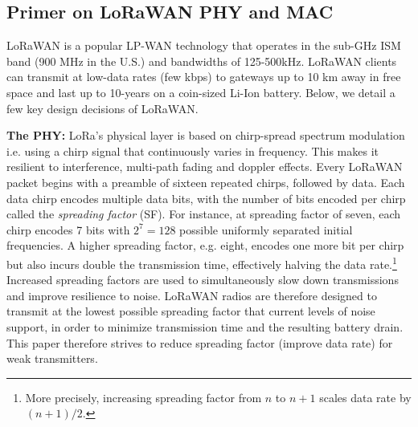 \subsection{Primer on LoRaWAN PHY and MAC}
\label{sec:lora}

LoRaWAN is a popular LP-WAN technology that operates in the sub-GHz ISM band (900 MHz in the U.S.) and bandwidths of 125-500kHz. LoRaWAN clients can transmit at low-data rates (few kbps) to gateways up to 10 km away in free space and last up to 10-years on a coin-sized Li-Ion battery. Below, we detail a few key design decisions of LoRaWAN.\vspace*{0.02in}

\noindent \textbf{The PHY: } LoRa's physical layer is based on chirp-spread spectrum modulation i.e. using a chirp signal that continuously varies in frequency. This makes  it resilient to interference, multi-path fading and doppler effects. Every LoRaWAN packet begins with a preamble of sixteen repeated chirps, followed by data. Each data chirp encodes multiple data bits, with the number of  bits encoded per chirp called the \textit{spreading factor} (SF). For instance, at spreading factor of seven, each chirp encodes 7 bits with $2^7 = 128$ possible uniformly separated initial frequencies. A higher spreading factor, e.g. eight, encodes one more bit per chirp but also incurs double the transmission time, effectively halving the data rate.\footnote{More precisely, increasing spreading factor from $n$ to $n+1$ scales data rate by $(n+1)/2$.} Increased spreading factors are used to simultaneously slow down transmissions and improve resilience to noise. LoRaWAN radios are therefore designed to transmit at the lowest possible spreading factor that current levels of noise support, in order to minimize transmission time and the resulting battery drain. This paper therefore strives to reduce spreading factor (improve data rate) for weak transmitters. 



